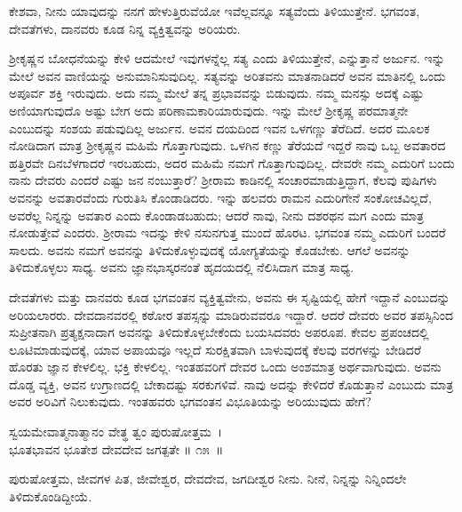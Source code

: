 \begin{artha}
ಕೇಶವಾ, ನೀನು ಯಾವುದನ್ನು ನನಗೆ ಹೇಳುತ್ತಿರುವೆಯೋ ಇವೆಲ್ಲವನ್ನೂ ಸತ್ಯವೆಂದು ತಿಳಿಯುತ್ತೇನೆ. ಭಗವಂತ, ದೇವತೆಗಳು, ದಾನವರು ಕೂಡ ನಿನ್ನ ವ್ಯಕ್ತಿತ್ವವನ್ನು ಅರಿಯರು.
\end{artha}

ಶ‍್ರೀಕೃಷ್ಣನ ಬೋಧನೆಯನ್ನು ಕೇಳಿ ಆದಮೇಲೆ ಇವುಗಳನ್ನೆಲ್ಲ ಸತ್ಯ ಎಂದು ತಿಳಿಯುತ್ತೇನೆ, ಎನ್ನುತ್ತಾನೆ ಅರ್ಜುನ. ಇನ್ನು ಮೇಲೆ ಅವನ ವಾಣಿಯನ್ನು ಅನುಮಾನಿಸುವುದಿಲ್ಲ. ಸತ್ಯವನ್ನು ಅರಿತವನು ಮಾತನಾಡಿದರೆ ಅವನ ಮಾತಿನಲ್ಲಿ ಒಂದು ಅಪೂರ್ವ ಶಕ್ತಿ ಇರುವುದು. ಅದು ನಮ್ಮ ಮೇಲೆ ತನ್ನ ಪ್ರಭಾವವನ್ನು ಬಿಡುವುದು. ನಮ್ಮ ಮನಸ್ಸು ಅದಕ್ಕೆ ಎಷ್ಟು ಅಣಿಯಾಗುವುದೊ ಅಷ್ಟು ಬೇಗ ಅದು ಪರಿಣಾಮಕಾರಿಯಾರುವುದು. ಇನ್ನು ಮೇಲೆ ಶ‍್ರೀಕೃಷ್ಣ ಪರಮಾತ್ಮನೇ ಎಂಬುದನ್ನು ಸಂಶಯ ಪಡುವುದಿಲ್ಲ ಅರ್ಜುನ. ಅವನ ದಯದಿಂದ ಇವನ ಒಳಗಣ್ಣು ತೆರೆದಿದೆ. ಅದರ ಮೂಲಕ ನೋಡಿದಾಗ ಮಾತ್ರ ಶ‍್ರೀಕೃಷ್ಣನ ಮಹಿಮೆ ಗೊತ್ತಾಗುವುದು. ಒಳಗಿನ ಕಣ್ಣು ತೆರೆಯದೆ ಇದ್ದರೆ ನಾವು ಒಬ್ಬ ಅವತಾರದ ಹತ್ತಿರವೇ ದಿನಬೆಳಗಾದರೆ ಇರಬಹುದು, ಅದರ ಮಹಿಮೆ ನಮಗೆ ಗೊತ್ತಾಗುವುದಿಲ್ಲ. ದೇವರೇ ನಮ್ಮ ಎದುರಿಗೆ ಬಂದು ನಾನು ದೇವರು ಎಂದರೆ ಎಷ್ಟು ಜನ ನಂಬುತ್ತಾರೆ? ಶ‍್ರೀರಾಮ ಕಾಡಿನಲ್ಲಿ ಸಂಚಾರಮಾಡುತ್ತಿದ್ದಾಗ, ಕೆಲವು ಪುಷಿಗಳು ಅವನನ್ನು ಅವತಾರವೆಂದು ಗುರುತಿಸಿ ಕೊಂಡಾಡಿದರು. ಇನ್ನು ಹಲವರು ರಾಮನ ಎದುರಿಗೇನೆ ಸಂಕೋಚವಿಲ್ಲದೆ, ಅವರೆಲ್ಲ ನಿನ್ನನ್ನು ಅವತಾರ ಎಂದು ಕೊಂಡಾಡಬಹುದು; ಆದರೆ ನಾವು, ನೀನು ದಶರಥನ ಮಗ ಎಂದು ಮಾತ್ರ ನೋಡುತ್ತೇವೆ ಎಂದರು. ಶ‍್ರೀರಾಮ ಇದನ್ನು ಕೇಳಿ ನಸುನಗುತ್ತ ಮುಂದೆ ಹೊರಟ. ಭಗವಂತ ನಮ್ಮ ಎದುರಿಗೆ ಬಂದರೆ ಸಾಲದು. ಅವನು ನಮಗೆ ಅವನನ್ನು ತಿಳಿದುಕೊಳ್ಳುವುದಕ್ಕೆ ಯೋಗ್ಯತೆಯನ್ನು ಕೊಡಬೇಕು. ಆಗಲೆ ಅವನನ್ನು ತಿಳಿದುಕೊಳ್ಳಲು ಸಾಧ್ಯ. ಅವನು ಜ್ಞಾನಭಾಸ್ಕರನಂತೆ ಹೃದಯದಲ್ಲಿ ನೆಲಿಸಿದಾಗ ಮಾತ್ರ ಸಾಧ್ಯ.

ದೇವತೆಗಳು ಮತ್ತು ದಾನವರು ಕೂಡ ಭಗವಂತನ ವ್ಯಕ್ತಿತ್ವವೇನು, ಅವನು ಈ ಸೃಷ್ಟಿಯಲ್ಲಿ ಹೇಗೆ ಇದ್ದಾನೆ ಎಂಬುದನ್ನು ಅರಿಯಲಾರರು. ದೇವದಾನವರಲ್ಲಿ ಕಠೋರ ತಪಸ್ಸನ್ನು ಮಾಡಿರುವವರೂ ಇದ್ದಾರೆ. ಆದರೆ ದೇವರು ಅವರ ತಪಸ್ಸಿನಿಂದ ಸುಪ್ರೀತನಾಗಿ ಪ್ರತ್ಯಕ್ಷ\-ನಾದಾಗ ಅವನನ್ನು ತಿಳಿದುಕೊಳ್ಳಬೇಕೆಂದು ಬಯಸಿದವರು ಅಪರೂಪ. ಕೇವಲ ಪ್ರಪಂಚದಲ್ಲಿ ಲೂಟಿಮಾಡುವುದಕ್ಕೆ, ಯಾವ ಅಪಾಯವೂ ಇಲ್ಲದೆ ಸುರಕ್ಷಿತವಾಗಿ ಬಾಳುವುದಕ್ಕೆ ಕೆಲವು ವರಗಳನ್ನು ಬೇಡಿದರೆ ಹೊರತು ಜ್ಞಾನ ಕೇಳಲಿಲ್ಲ. ಭಕ್ತಿ ಕೇಳಲಿಲ್ಲ. ಇಂತಹವರಿಗೆ ದೇವರ ಒಂದು ಅಂಶಮಾತ್ರ ಅರ್ಥವಾಗುವುದು. ಅವನು ದೊಡ್ಡ ವ್ಯಕ್ತಿ, ಅವನ ಉಗ್ರಾಣದಲ್ಲಿ ಬೇಕಾದಷ್ಟು ಸರಕುಗಳಿವೆ. ನಾವು ಅದನ್ನು ಕೇಳಿದರೆ ಕೊಡುತ್ತಾನೆ ಎಂಬುದು ಮಾತ್ರ ಅವರ ಅರಿವಿಗೆ ನಿಲುಕುವುದು. ಇಂತಹವರು ಭಗವಂತನ ವಿಭೂತಿಯನ್ನು ಅರಿಯುವುದು ಹೇಗೆ?

\begin{shloka}
ಸ್ವಯಮೇವಾತ್ಮನಾತ್ಮಾನಂ ವೇತ್ಥ ತ್ವಂ ಪುರುಷೋತ್ತಮ~।\\ಭೂತಭಾವನ ಭೂತೇಶ ದೇವದೇವ ಜಗತ್ಪತೇ \hfill॥ ೧೫~॥
\end{shloka}

\begin{artha}
ಪುರುಷೋತ್ತಮ, ಜೀವಗಳ ಪಿತ, ಜೀವೇಶ್ವರ, ದೇವದೇವ, ಜಗದೀಶ್ವರ ನೀನು. ನೀನೆ, ನಿನ್ನನ್ನು ನಿನ್ನಿಂದಲೇ ತಿಳಿದುಕೊಂಡಿದ್ದೀಯೆ.
\end{artha}

